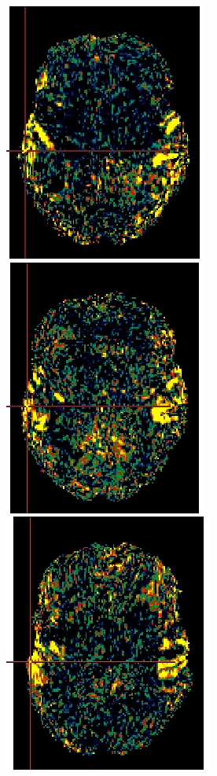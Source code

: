 \documentclass[pdftex,ptm,12pt,a4paper]{report}
\theoremstyle{definition}
\begin{document}
\begin{figure}[h]
\begin{multicols}{2}
\includegraphics[scale=0.6]{graphics/slices/sub3.png}
\includegraphics[scale=0.6]{graphics/slices/sub6.png}
\hfill
\includegraphics[scale=0.6]{graphics/slices/sub9.png}

\end{multicols}
\end{figure}
\end{document}
